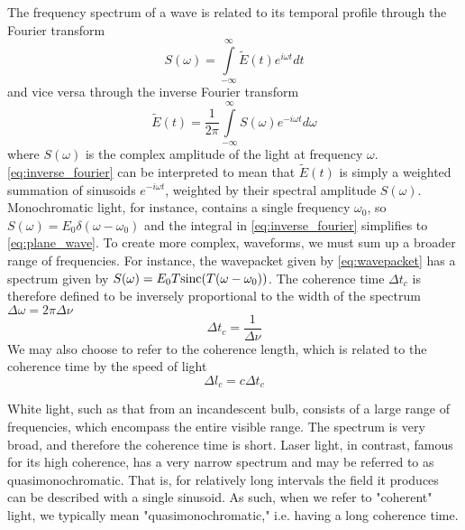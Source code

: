 The frequency spectrum of a wave is related to its temporal profile through the Fourier transform
\begin{equation} \label{eq:fourier}
S(\omega) = \int\limits_{-\infty}^{\infty} \tilde{E}(t) e^{i\omega t} dt
\end{equation}
and vice versa through the inverse Fourier transform
\begin{equation} \label{eq:inverse_fourier}
\tilde{E}(t) = \frac{1}{2\pi}\int\limits_{-\infty}^{\infty} S(\omega) e^{-i\omega t} d\omega
\end{equation}
where $S(\omega)$ is the complex amplitude of the light at frequency $\omega$. \autoref{eq:inverse_fourier} can be interpreted to mean that $\tilde{E}(t)$ is simply a weighted summation of sinusoids $e^{-i\omega t}$, weighted by their spectral amplitude $S(\omega)$. Monochromatic light, for instance, contains a single frequency $\omega_0$, so $S(\omega) = E_0\delta(\omega-\omega_0)$ and the integral in \autoref{eq:inverse_fourier} simplifies to \autoref{eq:plane_wave}. To create more complex, waveforms, we must sum up a broader range of frequencies. For instance, the wavepacket given by \autoref{eq:wavepacket} has a spectrum given by $S(\omega)=E_0 T \textnormal{sinc}(T(\omega-\omega_0))$. The coherence time $\Delta t_c$ is therefore defined to be inversely proportional to the width of the spectrum $\Delta \omega=2\pi\Delta\nu$
\begin{equation}
\Delta t_c = \frac{1}{\Delta \nu}
\end{equation}
We may also choose to refer to the coherence length, which is related to the coherence time by the speed of light
\begin{equation}
\Delta l_c = c\Delta t_c
\end{equation}

White light, such as that from an incandescent bulb, consists of a large range of frequencies, which encompass the entire visible range. The spectrum is very broad, and therefore the coherence time is short. Laser light, in contrast, famous for its high coherence, has a very narrow spectrum and may be referred to as quasimonochromatic. That is, for relatively long intervals the field it produces can be described with a single sinusoid. As such, when we refer to "coherent" light, we typically mean "quasimonochromatic," i.e. having a long coherence time. 




